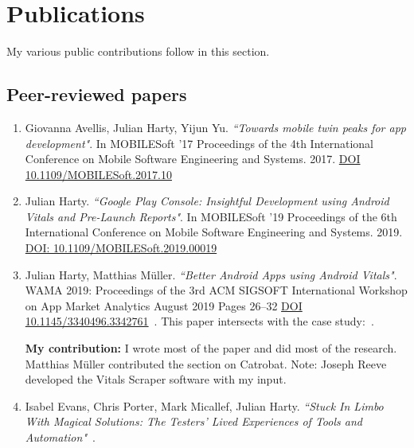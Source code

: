 \section{Publications}
\label{section-publications}
My various public contributions follow in this section.

\subsection{Peer-reviewed papers}
\begin{enumerate}
    \item 	Giovanna Avellis, Julian Harty, Yijun Yu. \emph{``Towards mobile twin peaks for app development"}. In MOBILESoft '17 Proceedings of the 4th International Conference on Mobile Software Engineering and Systems. 2017. \href{https://doi.org/10.1109/MOBILESoft.2017.10}{DOI 10.1109/MOBILESoft.2017.10}~\citep{avellis_harty_yu_towards_mobile_twin_peaks}
    

    \item Julian Harty. \emph{``Google Play Console: Insightful Development using Android Vitals and Pre-Launch Reports"}. In MOBILESoft '19 Proceedings of the 6th International Conference on Mobile Software Engineering and Systems. 2019. \href{https://doi.org/10.1109/MOBILESoft.2019.00019}{DOI: 10.1109/MOBILESoft.2019.00019} ~\citep{harty_google_play_console_insightful_development_using_android_vitals_and_pre_launch_reports}
    
    \item Julian Harty, Matthias Müller. \emph{``Better Android Apps using Android Vitals"}.  WAMA 2019: Proceedings of the 3rd ACM SIGSOFT International Workshop on App Market Analytics August 2019 Pages 26–32 \href{https://doi.org/10.1145/3340496.3342761}{DOI 10.1145/3340496.3342761}~\citep{harty_better_android_apps_using_android_vitals}. This paper intersects with the case study:~\href{section-catrobat-case-study}{}.
    
    \textbf{My contribution:} I wrote most of the paper and did most of the research. Matthias Müller contributed the section on Catrobat. Note: Joseph Reeve developed the Vitals Scraper software with my input.
    
    \item Isabel Evans, Chris Porter, Mark Micallef, Julian Harty. \emph{``Stuck In Limbo With Magical Solutions: The Testers’ Lived Experiences of Tools and Automation"}~\citep{evans2020stuck}. 
    

\end{enumerate}
